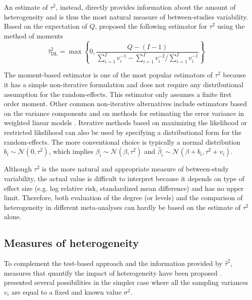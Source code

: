 \documentclass[11pt,a4paper,twoside,openany]{book}\usepackage{knitr}
\begin{document}
{{An estimate of $\tau^2$, instead, directly provides information about the amount of heterogeneity and is thus the most natural measure of between-studies variability. Based on the expectation of $Q$, \cite{dersimonian1986meta} proposed the following estimator for $\tau^2$ using the method of moments 
\begin{equation}
\hat \tau^2_{\text{DL}} = \max \left\{0, \frac{Q - (I-1)}{\sum_{i=1}^I v_i^{-1} - \sum_{i=1}^I v_i^{-2}/\sum_{i=1}^I v_i^{-1} } \right\}
\label{eq:tau2DL}
\end{equation}

\noindent The moment-based estimator is one of the most popular estimators of $\tau^2$ because it has a simple non-iterative formulation and does not require any distributional assumption for the random-effects. This estimator only assumes a finite first order moment. Other common non-iterative alternatives include estimators based on the variance components \citep{hedges1983random} and on methods for estimating the error variance in weighted linear models \citep{sidik2005simple}. Iterative methods based on maximizing the likelihood or restricted likelihood can also be used by specifying a distributional form for the random-effects. The more conventional choice is typically a normal distribution $b_i \sim \mathcal{N}\left( 0, \tau^2 \right)$, which implies $\beta_i \sim \mathcal{N}\left(\beta, \tau^2 \right)$ and $\hat \beta_i \sim \mathcal{N}\left(\beta + b_i, \tau^2 + v_i \right)$.

Although $\tau^2$ is the more natural and appropriate measure of between-study variability, the actual value is difficult to interpret because it depends on type of effect size (e.g. log relative risk, standardized mean difference) and has no upper limit. Therefore, both evaluation of the degree (or levels) and the comparison of heterogeneity in different meta-analyses can hardly be based on the estimate of $\tau^2$ alone.


\subsection{Measures of heterogeneity}\label{sec:measures_het}

To complement the test-based approach and the information provided by $\hat \tau^2$, measures that quantify the impact of heterogeneity have been proposed \citep{higgins2002quantifying}. 
\cite{higgins2002quantifying} presented several possibilities in the simpler case where all the sampling variances $v_i$ are equal to a fixed and known value $\sigma^2$. 

}}
\end{document}
